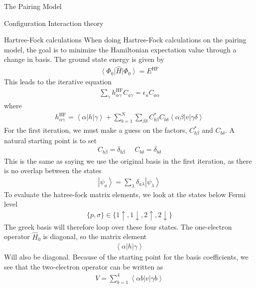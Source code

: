 \documentclass[twoside,english]{uiofysmaster}
\begin{document}
\begin{chapter}{The Pairing Model}
\begin{section}{Configuration Interaction theory}
	\end{section}

	\begin{section}{Hartree-Fock calculations}
		When doing Hartree-Fock calculations on the pairing model, the goal is to minimize the Hamiltonian expectation value through a change in basis. The ground state energy is given by 
		\begin{align}
			\left< \Phi_0 \right| \hat H \left| \Phi_0 \right> = E^{\text{HF}}
		\end{align}
		This leads to the iterative equation 
		\begin{align}
  			\sum_{\gamma} h_{\alpha \gamma}^{\text{HF}} C_{a \gamma} = \epsilon_{a} C_{a \alpha}
  		\end{align}
  		where 
  		\begin{align}
  			h_{\alpha \gamma}^{\text{HF}} = \left< \alpha \right| h \left| \gamma \right> + \sum_{b=1}^N \sum_{\beta \delta} C_{b \beta}^* C_{b \delta} \left< \alpha \beta \right| v \left| \gamma \delta \right> 
  		\end{align}
  		For the first iteration, we must make a guess on the factors, $C_{b \beta}^*$ and $C_{b \delta}$. A natural starting point is to set
  		\begin{align}
  			C_{b \beta} = \delta_{b \beta} \:\:\:\:\:\: C_{b \delta} = \delta_{b \delta}
  		\end{align}
  		This is the same as saying we use the original basis in the first iteration, as there is no overlap between the states
  		\begin{align}
  			\left| \psi_a \right> = \sum_ \lambda \delta_{a \lambda} \left| \psi_ \lambda \right> 
  		\end{align}
  		To evaluate the hatree-fock matrix elements, we look at the states below Fermi level 
  		\begin{align}
  			\{p, \sigma\} \in \{ 1 \uparrow, 1 \downarrow, 2 \uparrow, 2 \downarrow \}
  		\end{align}
  		The greek basis will therefore loop over these four states. The one-electron operator $\hat H_0$ is diagonal, so the matrix element
  		\begin{align}
  			\left< \alpha | h | \gamma \right> 
  		\end{align}
 		Will also be diagonal. Because of the starting point for the basis coefficients, we see that the two-electron operator can be written as
 		\begin{align}
 			V = \sum_{ b = 1 }^4 \left< \alpha b | v | \gamma b \right>  

\end{align}
\end{section}
\end{chapter}
\end{document}
